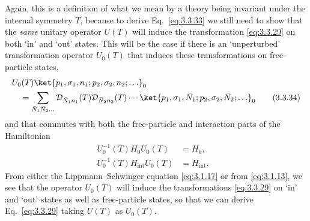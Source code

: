 Again, this is a definition of what we mean by a theory being invariant under the
internal symmetry $T$, because to derive Eq.~\eqref{eq:3.3.33} we still need to show that
the \textit{same} unitary operator $U(T)$ will induce the transformation \eqref{eq:3.3.29}
on both `in' and `out' states. This will be the case if there is an `unperturbed'
transformation operator $U_0(T)$ that induces these transformations on
free-particle states,
\begin{align}
&U_0(T)\ket{p_1,\sigma_1,n_1;p_2,\sigma_2,n_2;\ldots}_0
\nonumber\\
&\quad=\sum_{\bar N_1\bar N_2\ldots}
\mathcal{D}_{\bar N_1n_1}(T)\mathcal{D}_{\bar N_2n_2}(T)\cdots
\ket{p_1,\sigma_1,\bar N_1;p_2,\sigma_2,\bar N_2;\ldots}_0
\tag{3.3.34}\label{eq:3.3.34}
\end{align}
and that commutes with both the free-particle and interaction parts of the
Hamiltonian
\begin{align}
U_0^{-1}(T)H_0U_0(T)&=H_0,
&\tag{3.3.35}\label{eq:3.3.35}\\
U_0^{-1}(T)H_{\mathrm{int}}U_0(T)&=H_{\mathrm{int}}.
&\tag{3.3.36}\label{eq:3.3.36}
\end{align}
From either the Lippmann--Schwinger equation \eqref{eq:3.1.17} or from \eqref{eq:3.1.13}, we see
that the operator $U_0(T)$ will induce the transformations \eqref{eq:3.3.29} on `in' and
`out' states as well as free-particle states, so that we can derive Eq.~\eqref{eq:3.3.29}
taking $U(T)$ as $U_0(T)$.

